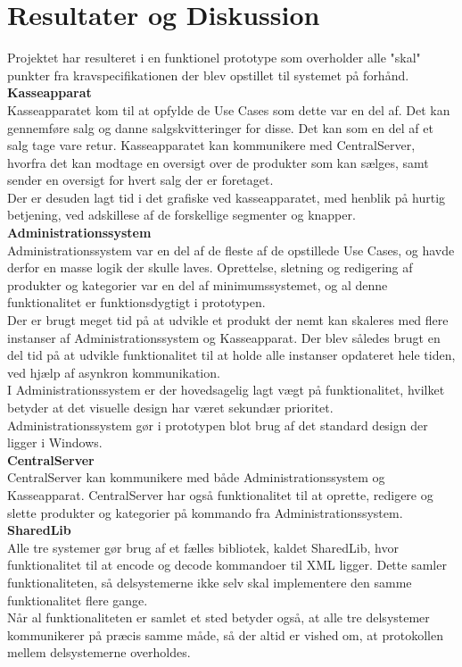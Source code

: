 \section{Resultater og Diskussion}
Projektet har resulteret i en funktionel prototype som overholder alle "skal" punkter fra kravspecifikationen der blev opstillet til systemet på forhånd.\\

\textbf{Kasseapparat}\\
Kasseapparatet kom til at opfylde de Use Cases som dette var en del af. Det kan gennemføre salg og danne salgskvitteringer for disse. Det kan som en del af et salg tage vare retur. Kasseapparatet kan kommunikere med CentralServer, hvorfra det kan modtage en oversigt over de produkter som kan sælges, samt sender en oversigt for hvert salg der er foretaget.\\
Der er desuden lagt tid i det grafiske ved kasseapparatet, med henblik på hurtig betjening, ved adskillese af de forskellige segmenter og knapper.\\

\textbf{Administrationssystem}\\
Administrationssystem var en del af de fleste af de opstillede Use Cases, og havde derfor en masse logik der skulle laves. Oprettelse, sletning og redigering af produkter og kategorier var en del af minimumssystemet, og al denne funktionalitet er funktionsdygtigt i prototypen.\\
Der er brugt meget tid på at udvikle et produkt der nemt kan skaleres med flere instanser af Administrationssystem og Kasseapparat. Der blev således brugt en del tid på at udvikle funktionalitet til at holde alle instanser opdateret hele tiden, ved hjælp af asynkron kommunikation.\\
I Administrationssystem er der hovedsagelig lagt vægt på funktionalitet, hvilket betyder at det visuelle design har været sekundær prioritet. Administrationssystem gør i prototypen blot brug af det standard design der ligger i Windows.\\

\textbf{CentralServer}\\
CentralServer kan kommunikere med både Administrationssystem og Kasseapparat. CentralServer har også funktionalitet til at oprette, redigere og slette produkter og kategorier på kommando fra Administrationssystem.\\

\textbf{SharedLib}\\
Alle tre systemer gør brug af et fælles bibliotek, kaldet SharedLib, hvor funktionalitet til at encode og decode kommandoer til XML ligger. Dette samler funktionaliteten, så delsystemerne ikke selv skal implementere den samme funktionalitet flere gange.\\
Når al funktionaliteten er samlet et sted betyder også, at alle tre delsystemer kommunikerer på præcis samme måde, så der altid er vished om, at protokollen mellem delsystemerne overholdes.\\
